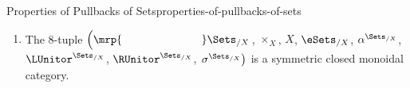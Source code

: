 \begin{proposition}{Properties of Pullbacks of Sets}{properties-of-pullbacks-of-sets}
\begin{enumerate}
\begin{webcompile}
            \end{webcompile}
        \item\label{properties-of-pullbacks-of-sets-symmetric-monoidality}The 8-tuple $\left(\mrp{\phantom{\LUnitor^{\Sets_{/X}}}}\Sets_{/X}\right.$, $\times_{X}$, $X$, $\eSets_{/X}$, $\alpha^{\Sets_{/X}}$, $\LUnitor^{\Sets_{/X}}$, $\RUnitor^{\Sets_{/X}}$, $\left.\sigma^{\Sets_{/X}}\right)$ is a symmetric closed monoidal category.
    \end{enumerate}
\end{proposition}
